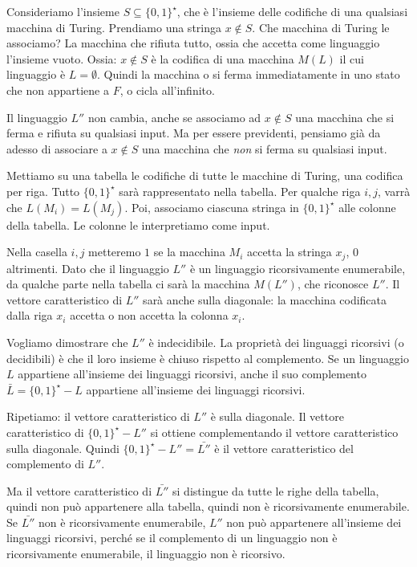 Consideriamo l'insieme $S \subseteq \{0,1\}^{\star}$, che \`e l'insieme delle codifiche di una qualsiasi macchina di Turing. Prendiamo una stringa $x \notin S$. Che macchina di Turing le associamo? La macchina che rifiuta tutto, ossia che accetta come linguaggio l'insieme vuoto. Ossia: $x \notin S$ \`e la codifica di una macchina $M(L)$ il cui linguaggio \`e $L = \emptyset$. Quindi la macchina o si ferma immediatamente in uno stato che non appartiene a $F$, o cicla all'infinito.

Il linguaggio $L''$ non cambia, anche se associamo ad $x \notin S$ una macchina che si ferma e rifiuta su qualsiasi input. Ma per essere previdenti, pensiamo gi\`a da adesso di associare a $x \notin S$ una macchina che \emph{non} si ferma su qualsiasi input.

Mettiamo su una tabella le codifiche di tutte le macchine di Turing, una codifica per riga. Tutto $\{ 0,1 \}^{\star}$ sar\`a rappresentato nella tabella. Per qualche riga $i, j$, varr\`a che $L(M_i) = L(M_j)$. Poi, associamo ciascuna stringa in $\{0, 1\}^{\star}$ alle colonne della tabella. Le colonne le interpretiamo come input.

Nella casella $i, j$ metteremo $1$ se la macchina $M_i$ accetta la stringa $x_j$, $0$ altrimenti. Dato che il linguaggio $L''$ \`e un linguaggio ricorsivamente enumerabile, da qualche parte nella tabella ci sar\`a la macchina $M(L'')$, che riconosce $L''$. Il vettore caratteristico di $L''$ sar\`a anche sulla diagonale: la macchina codificata dalla riga $x_i$ accetta o non accetta la colonna $x_i$.

Vogliamo dimostrare che $L''$ \`e indecidibile. La propriet\`a dei linguaggi ricorsivi (o decidibili) \`e che il loro insieme \`e chiuso rispetto al complemento. Se un linguaggio $L$ appartiene all'insieme dei linguaggi ricorsivi, anche il suo complemento $\bar{L} = \{0,1\}^{\star} - L$ appartiene all'insieme dei linguaggi ricorsivi.

Ripetiamo: il vettore caratteristico di $L''$ \`e sulla diagonale. Il vettore caratteristico di $\{0,1\}^{\star} - L''$ si ottiene complementando il vettore caratteristico sulla diagonale. Quindi $\{0,1\}^{\star} - L'' = \bar{L''}$ \`e il vettore caratteristico del complemento di $L''$.

Ma il vettore caratteristico di $\bar{L''}$ si distingue da tutte le righe della tabella, quindi non pu\`o appartenere alla tabella, quindi non \`e ricorsivamente enumerabile. Se $\bar{L''}$ non \`e ricorsivamente enumerabile, $L''$ non pu\`o appartenere all'insieme dei linguaggi ricorsivi, perch\'e se il complemento di un linguaggio non \`e ricorsivamente enumerabile, il linguaggio non \`e ricorsivo.


